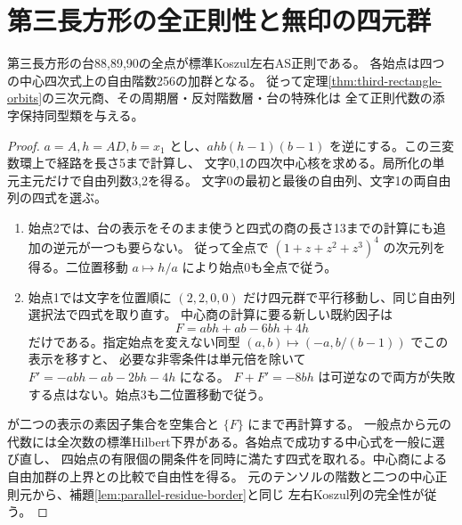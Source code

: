 \section{第三長方形の全正則性と無印の四元群}
\label{sec:third-rectangle-regularity}
\begin{theorem}\label{thm:third-rectangle-all-regular}
第三長方形の台88,89,90の全点が標準Koszul左右AS正則である。
各始点は四つの中心四次式上の自由階数256の加群となる。
従って定理\ref{thm:third-rectangle-orbits}の三次元商、その周期層・反対階数層・台の特殊化は
全て正則代数の添字保持同型類を与える。
\end{theorem}
\begin{proof}
$a=A,h=AD,b=x_1$ とし、$ahb(h-1)(b-1)$ を逆にする。この三変数環上で経路を長さ5まで計算し、
文字0,1の四次中心核を求める。局所化の単元主元だけで自由列数3,2を得る。
文字0の最初と最後の自由列、文字1の両自由列の四式を選ぶ。
\begin{enumerate}
\item 始点2では、台の表示をそのまま使うと四式の商の長さ13までの計算にも追加の逆元が一つも要らない。
従って全点で $(1+z+z^2+z^3)^4$ の次元列を得る。二位置移動 $a\mapsto h/a$ により始点0も全点で従う。
\item 始点1では文字を位置順に $(2,2,0,0)$ だけ四元群で平行移動し、同じ自由列選択法で四式を取り直す。
中心商の計算に要る新しい既約因子は
\[
 F=abh+ab-6bh+4h
\]
だけである。指定始点を変えない同型 $(a,b)\mapsto(-a,b/(b-1))$ でこの表示を移すと、
必要な非零条件は単元倍を除いて $F'=-abh-ab-2bh-4h$ になる。
$F+F'=-8bh$ は可逆なので両方が失敗する点はない。始点3も二位置移動で従う。
\end{enumerate}
 が二つの表示の素因子集合を空集合と $\{F\}$ にまで再計算する。
一般点から元の代数には全次数の標準Hilbert下界がある。各始点で成功する中心式を一般に選び直し、
四始点の有限個の開条件を同時に満たす四式を取れる。中心商による自由加群の上界との比較で自由性を得る。
元のテンソルの階数と二つの中心正則元から、補題\ref{lem:parallel-residue-border}と同じ
左右Koszul列の完全性が従う。
\end{proof}

